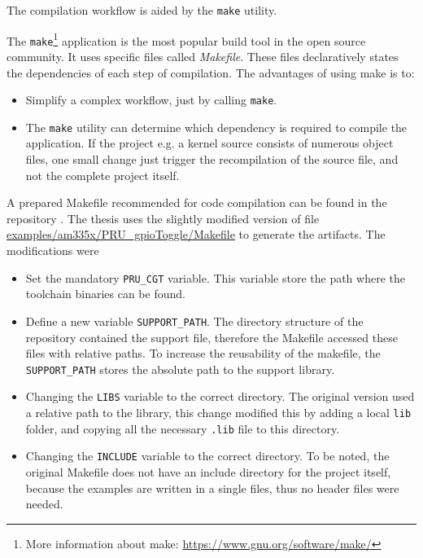 The compilation workflow is aided by the \verb+make+ utility.

The \verb+make+\footnote{More information about make: \url{https://www.gnu.org/software/make/}} application is the most popular build tool in the open source community. It uses specific files called \emph{Makefile}. These files declaratively states the dependencies of each step of compilation. The advantages of using make is to:
\begin{itemize}
	\item Simplify a complex workflow, just by calling \verb+make+.
	\item The \verb+make+ utility can determine which dependency is required to compile the application. If the project e.g. a kernel source consists of numerous object files, one small change just trigger the recompilation of the source file, and not the complete project itself.
\end{itemize}

A prepared Makefile recommended for \pru code compilation can be found in the repository \citep{TI_PRUSS_REPO}. The thesis uses the slightly modified version of  file \url{examples/am335x/PRU_gpioToggle/Makefile} to generate the artifacts. The modifications were
\begin{itemize}
	\item Set the mandatory \verb+PRU_CGT+ variable. This variable store the path where the toolchain binaries can be found.
	\item Define a new variable \verb+SUPPORT_PATH+. The directory structure of the repository contained the support file, therefore the Makefile accessed these files with relative paths. To increase the reusability of the makefile, the \verb+SUPPORT_PATH+ stores the absolute path to the support library.
	\item Changing the \verb+LIBS+ variable to the correct directory. The original version used a relative path to the library, this change modified this by adding a local \verb+lib+ folder, and copying all the necessary \verb+.lib+ file to this directory.
	\item Changing the \verb+INCLUDE+ variable to the correct directory. To be noted, the original Makefile does not have an include directory for the project itself, because the examples are written in a single files, thus no header files were needed.
\end{itemize}

